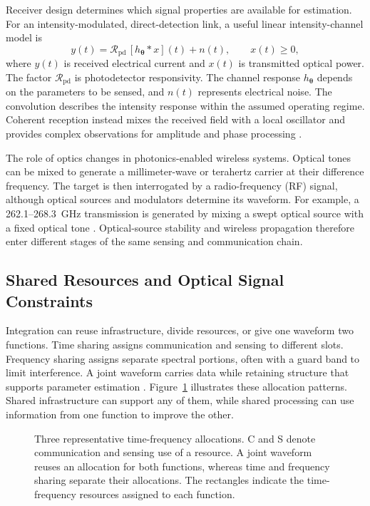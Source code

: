 Receiver design determines which signal properties are available for
estimation. For an intensity-modulated, direct-detection link, a useful
linear intensity-channel model is
\begin{equation}
y(t)=\mathcal{R}_{\mathrm{pd}}\,[h_{\boldsymbol{\theta}}*x](t)+n(t),
\qquad x(t)\geq 0,
\label{eq:imdd_observation}
\end{equation}
where $y(t)$ is received electrical current and $x(t)$ is transmitted optical
power. The factor $\mathcal{R}_{\mathrm{pd}}$ is photodetector responsivity.
The channel response
$h_{\boldsymbol{\theta}}$ depends on the parameters to be sensed, and $n(t)$
represents electrical noise. The convolution describes the intensity response
within the assumed operating regime. Coherent reception instead mixes the
received field with a local oscillator and provides complex observations for
amplitude and phase processing
\cite{Wen2024OISACArchitectures,OISAC_SCR00057}.

The role of optics changes in photonics-enabled wireless systems. Optical
tones can be mixed to generate a millimeter-wave or terahertz carrier at their
difference frequency. The target is then interrogated by a radio-frequency
(RF) signal, although
optical sources and modulators determine its waveform. For example, a
262.1--268.3~GHz transmission is generated by mixing a swept optical source
with a fixed optical tone \cite{OISAC_SCR00083}. Optical-source stability and
wireless propagation therefore enter different stages of the same sensing
and communication chain.

\subsection{Shared Resources and Optical Signal Constraints}
\label{sec:shared_resources_constraints}

Integration can reuse infrastructure, divide resources, or give one waveform
two functions. Time sharing assigns communication and sensing to different
slots. Frequency sharing assigns separate spectral portions, often with a
guard band to limit interference. A joint waveform carries data while
retaining structure that supports parameter estimation
\cite{Wen2024OISACArchitectures,Lyu2026PhotonicTHzWaveforms}.
Figure~\ref{fig:resource_sharing} illustrates these allocation patterns.
Shared infrastructure can support any of them, while shared processing can
use information from one function to improve the other.

\begin{figure}[!t]
\centering

\caption{Three representative time-frequency allocations. C and S denote
communication and sensing use of a resource. A joint waveform reuses an
allocation for both functions, whereas time and frequency sharing separate
their allocations. The rectangles indicate the time-frequency resources
assigned to each function.}
\label{fig:resource_sharing}
\end{figure}

